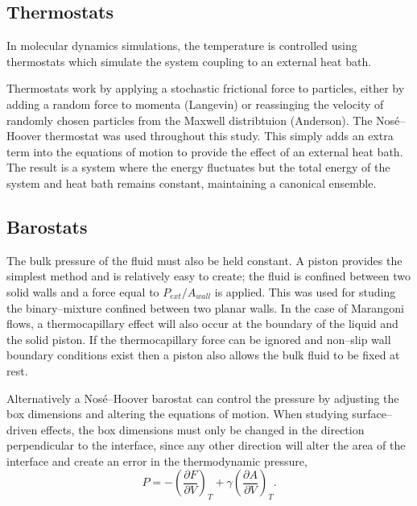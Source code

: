 \subsection{Thermostats}
In molecular dynamics simulations, the temperature is controlled using thermostats which simulate the system coupling to an external heat bath.

Thermostats work by applying a stochastic frictional force to particles, either by adding a random force to momenta (Langevin)\cite{Langevin} or reassinging the velocity of randomly chosen particles from the Maxwell distribtuion (Anderson)\cite{AndersonTherm}.
The Nos\'{e}--Hoover thermostat was used throughout this study.
This simply adds an extra term into the equations of motion to provide the effect of an external heat bath.\cite{NoseHoover1, NoseHoover2, NoseHoover3}
The result is a system where the energy fluctuates but the total energy of the system and heat bath remains constant, maintaining a canonical ensemble.

\subsection{Barostats}
The bulk pressure of the fluid must also be held constant.
A piston provides the simplest method and is relatively easy to create; the fluid is confined between two solid walls and a force equal to $P_{ext} / A_{wall}$ is applied.
This was used for studing the binary--mixture confined between two planar walls.
In the case of Marangoni flows, a thermocapillary effect will also occur at the boundary of the liquid and the solid piston.
If the thermocapillary force can be ignored and non--slip wall boundary conditions exist then a piston also allows the bulk fluid to be fixed at rest.

Alternatively a Nos\'{e}--Hoover barostat can control the pressure by adjusting the box dimensions and altering the equations of motion. \cite{NoseHoover1, NoseHoover2, NoseHoover3}
When studying surface--driven effects, the box dimensions must only be changed in the direction perpendicular to the interface, since any other direction will alter the area of the interface and create an error in the thermodynamic pressure,
\begin{equation}
P = - \left( \frac{\partial F}{\partial V} \right)_{T} + \gamma \left( \frac{\partial A}{\partial V} \right)_{T}.
\end{equation}

